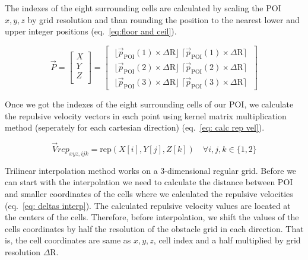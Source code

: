 \documentclass[letterpaper, 10 pt, conference]{ieeeconf}  %
\begin{document}
The indexes of the eight surrounding cells are calculated by scaling the POI $x,y,z$ by grid resolution and than rounding the position to the nearest lower and upper integer positions (eq.~\ref{eq:floor and ceil}).

\begin{equation}
	\label{eq:floor and ceil}
	\vec{P} =
	\begin{bmatrix}
		X \\
		Y \\
		Z \\
	\end{bmatrix}
	=
	\begin{bmatrix}
		\; \lfloor \vec{p}_{\mathrm{POI}}(1) \times\Delta \mathrm{R} \rfloor \; \lceil \vec{p}_{\mathrm{POI}}(1) \times\Delta \mathrm{R} \rceil \;  \\
		\; \lfloor \vec{p}_{\mathrm{POI}}(2) \times\Delta \mathrm{R} \rfloor \; \lceil \vec{p}_{\mathrm{POI}}(2) \times\Delta \mathrm{R} \rceil \; \\
		\; \lfloor \vec{p}_{\mathrm{POI}}(3) \times\Delta \mathrm{R} \rfloor \; \lceil \vec{p}_{\mathrm{POI}}(3) \times\Delta \mathrm{R} \rceil \; 
	\end{bmatrix}
\end{equation}

Once we got the indexes of the eight surrounding cells of our POI, we calculate the repulsive velocity vectors in each point using kernel matrix multiplication method (seperately for each cartesian direction) (eq.~\ref{eq: calc rep vel}).

\begin{equation}
	\label{eq: calc rep vel}
	\vec{V}rep_{xyz,ijk} = \mathrm{rep}(X[i], Y[j], Z[k]) \quad \forall i, j, k \in \{1, 2\}
\end{equation}

Trilinear interpolation method works on a 3-dimensional regular grid. Before we can start with the interpolation we need to calculate the distance between POI and smaller coordinates of the cells where we calculated the repulsive velocities (eq.~\ref{eq: deltas interp}). The calculated repulsive velocity values are located at the centers of the cells. Therefore, before interpolation, we shift the values of the cells coordinates by half the resolution of the obstacle grid in each direction. That is, the cell coordinates are same as $x,y,z$, cell index and a half multiplied by grid resolution $\Delta \mathrm{R}$.
\end{document}
